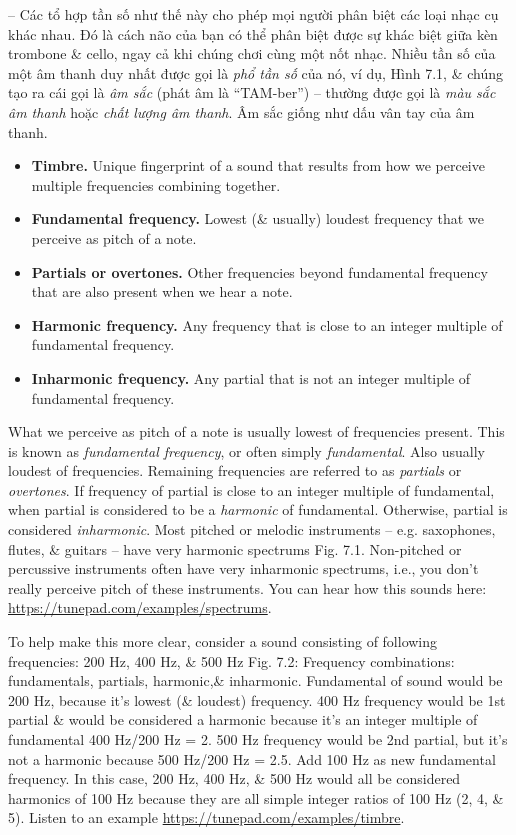 \documentclass{article}
\begin{document}
\begin{itemize}
\begin{itemize}
		-- Các tổ hợp tần số như thế này cho phép mọi người phân biệt các loại nhạc cụ khác nhau. Đó là cách não của bạn có thể phân biệt được sự khác biệt giữa kèn trombone \& cello, ngay cả khi chúng chơi cùng một nốt nhạc. Nhiều tần số của một âm thanh duy nhất được gọi là {\it phổ tần số} của nó, ví dụ, {\sf Hình 7.1}, \& chúng tạo ra cái gọi là {\it âm sắc} (phát âm là ``TAM-ber'') -- thường được gọi là {\it màu sắc âm thanh} hoặc {\it chất lượng âm thanh}. Âm sắc giống như dấu vân tay của âm thanh.
		\begin{itemize}
			\item {\bf Timbre.} Unique fingerprint of a sound that results from how we perceive multiple frequencies combining together.
			\item {\bf Fundamental frequency.} Lowest (\& usually) loudest frequency that we perceive as pitch of a note.
			\item {\bf Partials or overtones.} Other frequencies beyond fundamental frequency that are also present when we hear a note.
			\item {\bf Harmonic frequency.} Any frequency that is close to an integer multiple of fundamental frequency.
			\item {\bf Inharmonic frequency.} Any partial that is not an integer multiple of fundamental frequency.
		\end{itemize}
		What we perceive as pitch of a note is usually lowest of frequencies present. This is known as {\it fundamental frequency}, or often simply {\it fundamental}. Also usually loudest of frequencies. Remaining frequencies are referred to as {\it partials} or {\it overtones}. If frequency of partial is close to an integer multiple of fundamental, when partial is considered to be a {\it harmonic} of fundamental. Otherwise, partial is considered {\it inharmonic}. Most pitched or melodic instruments -- e.g. saxophones, flutes, \& guitars -- have very harmonic spectrums {\sf Fig. 7.1}. Non-pitched or percussive instruments often have very inharmonic spectrums, i.e., you don't really perceive pitch of these instruments. You can hear how this sounds here: \url{https://tunepad.com/examples/spectrums}.
		
		To help make this more clear, consider a sound consisting of following frequencies: 200 Hz, 400 Hz, \& 500 Hz {\sf Fig. 7.2: Frequency combinations: fundamentals, partials, harmonic,\& inharmonic.} Fundamental of sound would be 200 Hz, because it's lowest (\& loudest) frequency. 400 Hz frequency would be 1st partial \& would be considered a harmonic because it's an integer multiple of fundamental 400 Hz/200 Hz = 2. 500 Hz frequency would be 2nd partial, but it's not a harmonic because 500 Hz/200 Hz = 2.5. Add 100 Hz as new fundamental frequency. In this case, 200 Hz, 400 Hz, \& 500 Hz would all be considered harmonics of 100 Hz because they are all simple integer ratios of 100 Hz (2, 4, \& 5). Listen to an example \url{https://tunepad.com/examples/timbre}.
		

\end{itemize}
\end{itemize}
\end{document}
